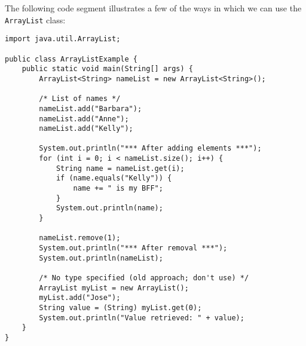 The following code segment illustrates a few of the ways in which we can use the \verb!ArrayList! class:

\begin{lstlisting}
import java.util.ArrayList;

public class ArrayListExample {
	public static void main(String[] args) {
		ArrayList<String> nameList = new ArrayList<String>();

		/* List of names */
		nameList.add("Barbara");
		nameList.add("Anne");
		nameList.add("Kelly");

		System.out.println("*** After adding elements ***");
		for (int i = 0; i < nameList.size(); i++) {
			String name = nameList.get(i);
			if (name.equals("Kelly")) {
				name += " is my BFF";
			}
			System.out.println(name);
		}

		nameList.remove(1);
		System.out.println("*** After removal ***");
		System.out.println(nameList);

		/* No type specified (old approach; don't use) */
		ArrayList myList = new ArrayList();
		myList.add("Jose");
		String value = (String) myList.get(0);
		System.out.println("Value retrieved: " + value);
	}
}
\end{lstlisting}
